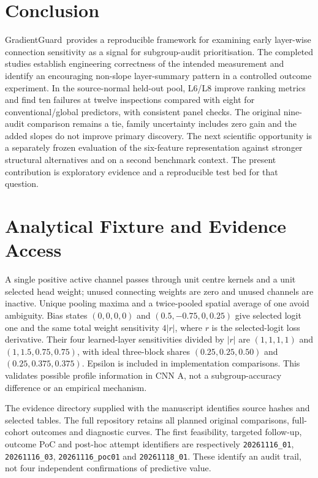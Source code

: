 \documentclass[nolineno]{ieeeaccess}
\newcommand{\GG}{GradientGuard}
\begin{document}
\section{Conclusion}
\GG\ provides a reproducible framework for examining early layer-wise connection sensitivity as a signal for subgroup-audit prioritisation. The completed studies establish engineering correctness of the intended measurement and identify an encouraging non-slope layer-summary pattern in a controlled outcome experiment. In the source-normal held-out pool, L6/L8 improve ranking metrics and find ten failures at twelve inspections compared with eight for conventional/global predictors, with consistent panel checks. The original nine-audit comparison remains a tie, family uncertainty includes zero gain and the added slopes do not improve primary discovery. The next scientific opportunity is a separately frozen evaluation of the six-feature representation against stronger structural alternatives and on a second benchmark context. The present contribution is exploratory evidence and a reproducible test bed for that question.

\appendices
\section{Analytical Fixture and Evidence Access}
\label{app:fixture}
A single positive active channel passes through unit centre kernels and a unit selected head weight; unused connecting weights are zero and unused channels are inactive. Unique pooling maxima and a twice-pooled spatial average of one avoid ambiguity. Bias states $(0,0,0,0)$ and $(0.5,-0.75,0,0.25)$ give selected logit one and the same total weight sensitivity $4|r|$, where $r$ is the selected-logit loss derivative. Their four learned-layer sensitivities divided by $|r|$ are $(1,1,1,1)$ and $(1,1.5,0.75,0.75)$, with ideal three-block shares $(0.25,0.25,0.50)$ and $(0.25,0.375,0.375)$. Epsilon is included in implementation comparisons. This validates possible profile information in CNN A, not a subgroup-accuracy difference or an empirical mechanism.

The evidence directory supplied with the manuscript identifies source hashes and selected tables. The full repository retains all planned original comparisons, full-cohort outcomes and diagnostic curves. The first feasibility, targeted follow-up, outcome PoC and post-hoc attempt identifiers are respectively \texttt{20261116\_01}, \texttt{20261116\_03}, \texttt{20261116\_poc01} and \texttt{20261118\_01}. These identify an audit trail, not four independent confirmations of predictive value.
\end{document}
